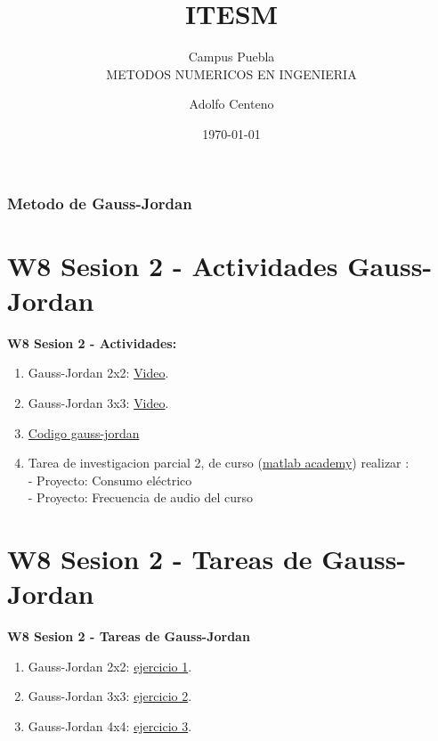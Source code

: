 \documentclass{beamer}
\begin{document}
\title{ITESM}  
\subtitle{Campus Puebla\\METODOS NUMERICOS EN INGENIERIA
}
\author{Adolfo Centeno}
\date{\today} 


\begin{frame}
\titlepage
\end{frame}

\begin{frame}\frametitle{Metodo de Gauss-Jordan}
\tableofcontents
\end{frame} 


\section{W8 Sesion 2 - Actividades Gauss-Jordan }

\begin{frame}

\textbf{W8 Sesion 2 - Actividades:}

\begin{enumerate}
\item
	Gauss-Jordan 2x2: \href{https://www.youtube.com/watch?v=10dlmC1MDco}{Video}.	
\item
	Gauss-Jordan 3x3: \href{https://www.youtube.com/watch?v=91xUg1L7O7s}{Video}.	

\item
	\href{https://github.com/adsoftsito/metodos-numericos/blob/master/w8/gaussjordan/gaussjor.pdf}{Codigo gauss-jordan} 

\item
    Tarea de investigacion parcial 2, de curso (\href{https://matlabacademy.mathworks.com/es}{matlab academy}) realizar : \\ 
    - Proyecto: Consumo eléctrico \\
	- Proyecto: Frecuencia de audio del curso 
	
\end{enumerate} 

\end{frame}


\section{W8 Sesion 2 - Tareas de Gauss-Jordan}

\begin{frame}


\textbf{W8 Sesion 2 - Tareas de Gauss-Jordan}


\begin{enumerate}
\item
	Gauss-Jordan 2x2: \href{https://www.youtube.com/watch?v=zn9BTnoGux8}{ejercicio 1}.	
\item
	Gauss-Jordan 3x3: \href{https://www.youtube.com/watch?v=em0ZWErimyU}{ejercicio 2}.	
\item
	Gauss-Jordan 4x4: \href{https://www.youtube.com/watch?v=uL3JwFy9BWA}{ejercicio 3}.	

\end{enumerate} 


\end{frame}
\end{document}

